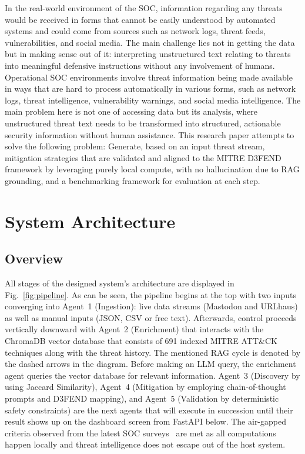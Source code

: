 \documentclass[conference]{IEEEtran}
\begin{document}
{In the real-world environment of the SOC, information regarding any threats would be received in forms that cannot be easily understood by automated systems and could come from sources such as network logs, threat feeds, vulnerabilities, and social media.
The main challenge lies not in getting the data but in making sense out of it:
interpreting unstructured text relating to threats into meaningful defensive instructions without any involvement of humans.
Operational SOC environments involve threat information being made available in ways that are hard to process automatically in various forms, such as network logs, threat intelligence, vulnerability warnings, and social media intelligence.
The main problem here is not one of accessing data but its analysis, where unstructured threat text needs to be transformed into structured, actionable security information without human assistance.
This research paper attempts to solve the following problem: Generate, based on an input threat stream, mitigation strategies that are validated and aligned to the MITRE D3FEND framework by leveraging purely local compute, with no hallucination due to RAG grounding, and a benchmarking framework for evaluation at each step.

\section{System Architecture}
\label{sec:architecture}

\subsection{Overview}

All stages of the designed system's architecture are displayed in Fig.~\ref{fig:pipeline}. As can be seen, the pipeline begins at the top with two inputs converging into Agent~1 (Ingestion): live data streams (Mastodon and URLhaus) as well as manual inputs (JSON, CSV or free text). Afterwards, control proceeds vertically downward with Agent~2 (Enrichment) that interacts with the ChromaDB vector database that consists of 691 indexed MITRE ATT&CK techniques along with the threat history. The mentioned RAG cycle is denoted by the dashed arrows in the diagram. Before making an LLM query, the enrichment agent queries the vector database for relevant information.
Agent~3 (Discovery by using Jaccard Similarity), Agent~4 (Mitigation by employing chain-of-thought prompts and D3FEND mapping), and Agent~5 (Validation by deterministic safety constraints) are the next agents that will execute in succession until their result shows up on the dashboard screen from FastAPI below. The air-gapped criteria observed from the latest SOC surveys~\cite{habibzadeh2025soc,hasanov2024llm} are met as all computations happen locally and threat intelligence does not escape out of the host system.

}
\end{document}
